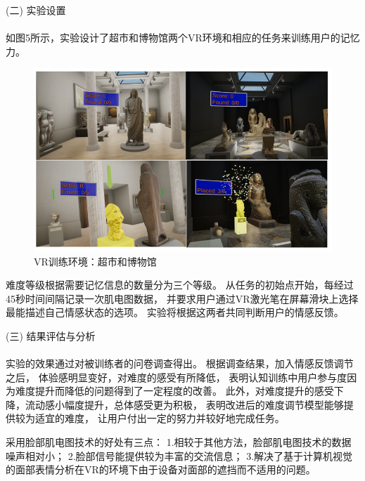 \documentclass[12pt]{article}
\begin{document}
            (二) 实验设置\paragraph{}
            如图5所示，实验设计了超市和博物馆两个VR环境和相应的任务来训练用户的记忆力。
            \begin{figure}[H]
            	
            	\centering
            	\includegraphics[scale=0.8]{images/VR.png}
            	\caption{VR训练环境：超市和博物馆\cite{ref15}}
            	\label{fig:label}
            \end{figure}
            难度等级根据需要记忆信息的数量分为三个等级。
            从任务的初始点开始，每经过45秒时间间隔记录一次肌电图数据，
            并要求用户通过VR激光笔在屏幕滑块上选择最能描述自己情感状态的选项。
            实验将根据这两者共同判断用户的情感反馈。

            (三) 结果评估与分析\paragraph{}
            实验的效果通过对被训练者的问卷调查得出。
            根据调查结果，加入情感反馈调节之后，
            体验感明显变好，对难度的感受有所降低，
            表明认知训练中用户参与度因为难度提升而降低的问题得到了一定程度的改善。
            此外，对难度提升的感受下降，流动感小幅度提升，总体感受更为积极，
            表明改进后的难度调节模型能够提供较为适宜的难度，
            让用户付出一定的努力并较好地完成任务。

            采用脸部肌电图技术的好处有三点：
            1.相较于其他方法，脸部肌电图技术的数据噪声相对小；
            2.脸部信号能提供较为丰富的交流信息；
            3.解决了基于计算机视觉的面部表情分析在VR的环境下由于设备对面部的遮挡而不适用的问题。
\end{document}
